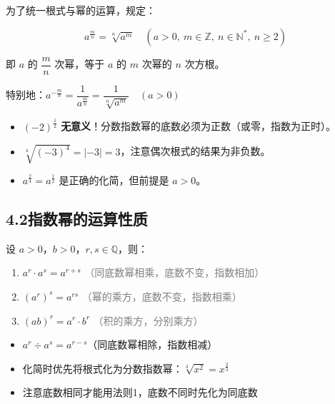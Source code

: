 \documentclass[12pt, a4paper]{ctexart}
\begin{document}
\begin{knowledgebox}[分数指数幂]
为了统一根式与幂的运算，规定：

\[
\boxed{a^{\frac{m}{n}} = \sqrt[n]{a^m}} \quad (a>0,\ m\in\mathbb{Z},\ n\in\mathbb{N}^*,\ n\geq 2)
\]

即 $a$ 的 $\dfrac{m}{n}$ 次幂，等于 $a$ 的 $m$ 次幂的 $n$ 次方根。

\vspace{4pt}
特别地：$a^{-\frac{m}{n}} = \dfrac{1}{a^{\frac{m}{n}}} = \dfrac{1}{\sqrt[n]{a^m}}\quad (a>0)$
\end{knowledgebox}

\begin{warnbox}[易错提醒]
\begin{itemize}[leftmargin=2em]
  \item $(-2)^{\frac{1}{2}}$ \textbf{无意义}！分数指数幂的底数必须为正数（或零，指数为正时）。
  \item $\sqrt[4]{(-3)^4} = |-3| = 3$，注意偶次根式的结果为非负数。
  \item $a^{\frac{2}{4}} = a^{\frac{1}{2}}$ 是正确的化简，但前提是 $a>0$。
\end{itemize}
\end{warnbox}

\subsection*{4.2\quad 指数幂的运算性质}

\begin{knowledgebox}[指数幂运算三大法则]
设 $a>0$，$b>0$，$r,s\in\mathbb{Q}$，则：
\begin{enumerate}[leftmargin=2em]
  \item $\boxed{a^r \cdot a^s = a^{r+s}}$ \quad \textcolor{gray}{（同底数幂相乘，底数不变，指数相加）}
  \item $\boxed{(a^r)^s = a^{rs}}$ \quad \textcolor{gray}{（幂的乘方，底数不变，指数相乘）}
  \item $\boxed{(ab)^r = a^r \cdot b^r}$ \quad \textcolor{gray}{（积的乘方，分别乘方）}
\end{enumerate}
\end{knowledgebox}

\begin{tipbox}[运算小技巧]
\begin{itemize}[leftmargin=2em]
  \item $a^r \div a^s = a^{r-s}$（同底数幂相除，指数相减）
  \item 化简时优先将根式化为分数指数幂：$\sqrt[3]{x^2} = x^{\frac{2}{3}}$
  \item 注意底数相同才能用法则1，底数不同时先化为同底数
\end{itemize}
\end{tipbox}
\end{document}
